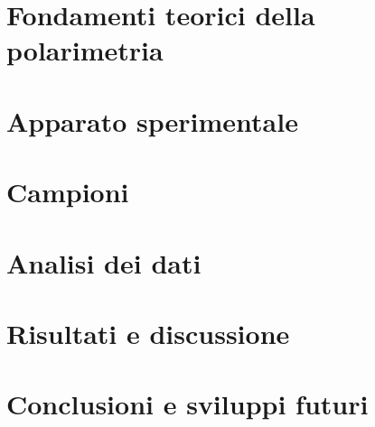 \documentclass{Configuration_Files/PoliMi3i_thesis}
\newcommand{\REVstart}[1]{\color{#1}}
\newcommand{\REVend}[1]{\color{black}}
\begin{document}
\chapter{Fondamenti teorici della polarimetria}
\label{ch:teoria}
\REVstart{revTeoria}

\REVend{revTeoria}

\chapter{Apparato sperimentale}
\label{ch:apparato}
\REVstart{revSetup}

\REVend{revSetup}

\chapter{Campioni}
\label{ch:campioni}
\REVstart{revSetup}

\REVend{revSetup}

\chapter{Analisi dei dati}
\label{ch:analisi}
\REVstart{revAnalisi}

\REVend{revAnalisi}

\chapter{Risultati e discussione}
\label{ch:risultati}
\REVstart{revRisultati}

\REVend{revRisultati}

\chapter{Conclusioni e sviluppi futuri}
\label{ch:conclusioni}
\REVstart{revConcl}

\REVend{revConcl}




\end{document}
